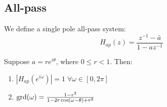 \subsection{All-pass} \label{sec:allpass}
\begin{definition}
    We define a single pole all-pass system:
    \[H_{ap}(z) = \frac{z^{-1} - \bar{a}}{1 - az^{-1}}\]
\end{definition}
\begin{lemma}
    Suppose $a = r e^{i \theta}$, where $0 \leq r < 1$. Then:
    \begin{enumerate}
        \item \label{lem:allpass const} $|H_{ap}(e^{i\omega})| = 1 \; \forall \omega \in [0, 2\pi]$
        \item \label{lem:allpass group delay} $\operatorname{grd}(\omega) = \frac{1 - r^2}{1 - 2r \cos (\omega - \theta) + r^2}$
    \end{enumerate}
\end{lemma}
